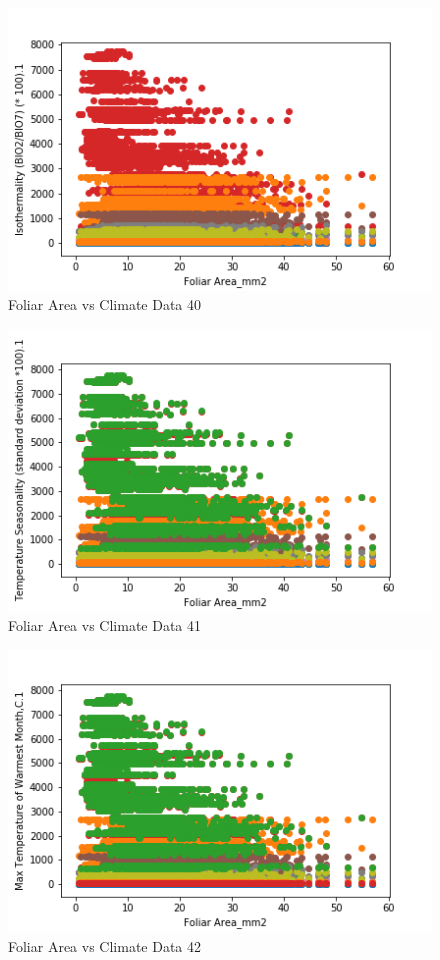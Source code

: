 \documentclass[letterpaper]{article}
\begin{document}
\begin{figure}[h]
\caption{Foliar Area vs Climate Data 40\label{fig:Foliar_Area_vs_40}}
\centering
\includegraphics[width=0.7\paperwidth]{Foliar_Area_vs_40}
\end{figure}


\begin{figure}[h]
\caption{Foliar Area vs Climate Data 41\label{fig:Foliar_Area_vs_41}}
\centering
\includegraphics[width=0.7\paperwidth]{Foliar_Area_vs_41}
\end{figure}


\begin{figure}[h]
\caption{Foliar Area vs Climate Data 42\label{fig:Foliar_Area_vs_42}}
\centering
\includegraphics[width=0.7\paperwidth]{Foliar_Area_vs_42}
\end{figure}
\end{document}
